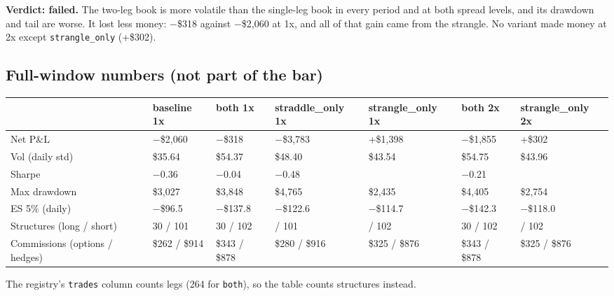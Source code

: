 \documentclass{article}
\begin{document}
\textbf{Verdict: failed.} The two-leg book is more volatile than the single-leg book in every period and at both spread levels, and its drawdown and tail are worse. It lost less money: \ensuremath{-}\$318 against \ensuremath{-}\$2,060 at 1x, and all of that gain came from the strangle. No variant made money at 2x except \texttt{strangle\_\allowbreak{}only} (+\$302).

\subsection{Full-window numbers (not part of the bar)}

\begin{center}\small
\begin{tabularx}{\linewidth}{>{\raggedright\arraybackslash}X l l >{\raggedright\arraybackslash}X >{\raggedright\arraybackslash}X l >{\raggedright\arraybackslash}X}
\toprule
\textbf{} & \textbf{baseline 1x} & \textbf{both 1x} & \textbf{straddle\_only 1x} & \textbf{strangle\_only 1x} & \textbf{both 2x} & \textbf{strangle\_only 2x} \\
\midrule
Net P\&L & \ensuremath{-}\$2,060 & \ensuremath{-}\$318 & \ensuremath{-}\$3,783 & +\$1,398 & \ensuremath{-}\$1,855 & +\$302 \\
Vol (daily std) & \$35.64 & \$54.37 & \$48.40 & \$43.54 & \$54.75 & \$43.96 \\
Sharpe & \ensuremath{-}0.36 & \ensuremath{-}0.04 & \ensuremath{-}0.48 & 0.20 & \ensuremath{-}0.21 & 0.04 \\
Max drawdown & \$3,027 & \$3,848 & \$4,765 & \$2,435 & \$4,405 & \$2,754 \\
ES 5\% (daily) & \ensuremath{-}\$96.5 & \ensuremath{-}\$137.8 & \ensuremath{-}\$122.6 & \ensuremath{-}\$114.7 & \ensuremath{-}\$142.3 & \ensuremath{-}\$118.0 \\
Structures (long /\allowbreak{} short) & 30 /\allowbreak{} 101 & 30 /\allowbreak{} 102 & 30 /\allowbreak{} 101 & 30 /\allowbreak{} 102 & 30 /\allowbreak{} 102 & 30 /\allowbreak{} 102 \\
Commissions (options /\allowbreak{} hedges) & \$262 /\allowbreak{} \$914 & \$343 /\allowbreak{} \$878 & \$280 /\allowbreak{} \$916 & \$325 /\allowbreak{} \$876 & \$343 /\allowbreak{} \$878 & \$325 /\allowbreak{} \$876 \\
\bottomrule
\end{tabularx}
\end{center}

The registry's \texttt{trades} column counts legs (264 for \texttt{both}), so the table counts structures instead.
\end{document}
